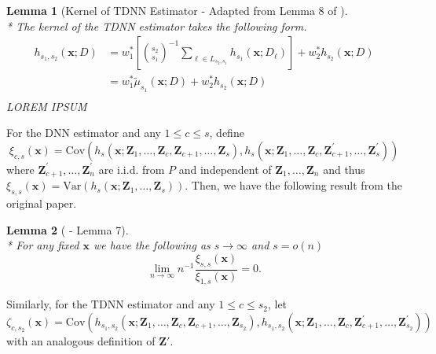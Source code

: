 \documentclass[letterpaper,10pt]{article}
\numberwithin{equation}{section}
\numberwithin{thm}{section}
\newtheorem{lem}{Lemma}
\numberwithin{lem}{section}
\numberwithin{cor}{section}
\newcommand{\1}{\mathbbm{1}}
\newcommand{\Var}{\text{Var}}
\newcommand{\Cov}{\text{Cov}}
\begin{document}
\begin{lem}[Kernel of TDNN Estimator - Adapted from Lemma 8 of \citet{demirkaya_optimal_2024}]\label{TDNN_kernel}\mbox{}\\*
	The kernel of the TDNN estimator takes the following form.
	\begin{equation}
		\begin{aligned}
			h_{s_1, s_2}\left(\mathbf{x}; D\right)
			 & = w_{1}^{*}\left[\binom{s_2}{s_1}^{-1}\sum_{\ell \in L_{s_2, s_1}} h_{s_1}\left(\mathbf{x}; D_{\ell}\right)\right] + w_{2}^{*} h_{s_2}\left(\mathbf{x}; D\right) \\
			 & = w_{1}^{*} \tilde{\mu}_{s_1}\left(\mathbf{x}; D\right) + w_{2}^{*} h_{s_2}\left(\mathbf{x}; D\right)                                                            \\
		\end{aligned}
	\end{equation}
	{\color{red} LOREM IPSUM}
\end{lem}


For the DNN estimator and any $1 \leq c \leq s$, define
\begin{equation}
	\xi_{c,s}\left(\mathbf{x}\right)
	= \Cov\left(h_{s}\left(\mathbf{x}; \mathbf{Z}_1, \ldots, \mathbf{Z}_c, \mathbf{Z}_{c+1}, \ldots, \mathbf{Z}_s\right),
	h_{s}\left(\mathbf{x}; \mathbf{Z}_1, \ldots, \mathbf{Z}_c, \mathbf{Z}_{c+1}^{\prime}, \ldots, \mathbf{Z}_s^{\prime}\right)\right)
\end{equation}
where $\mathbf{Z}_{c+1}^{\prime}, \ldots, \mathbf{Z}_n^{\prime}$ are i.i.d. from $P$ and independent of $\mathbf{Z}_1, \ldots, \mathbf{Z}_n$ and thus
$\xi_{s,s}\left(\mathbf{x}\right) = \Var\left(h_s\left(\mathbf{x}; \mathbf{Z}_1, \ldots, \mathbf{Z}_s\right)\right).$
Then, we have the following result from the original paper.

\begin{lem}[\citet{demirkaya_optimal_2024} - Lemma 7]\label{Cov_DNN_k}\mbox{}\\*
	For any fixed $\mathbf{x}$ we have the following as $s \rightarrow \infty$ and $s = o(n)$
	\begin{equation}
		\lim_{n \rightarrow \infty} n^{-1}\frac{\xi_{s,s}\left(\mathbf{x}\right)}{\xi_{1,s}\left(\mathbf{x}\right)}
		= 0.
	\end{equation}
\end{lem}

Similarly, for the TDNN estimator and any $1 \leq c \leq s_2$, let
\begin{equation}
	\zeta_{c,s_2}\left(\mathbf{x}\right)
	= \Cov\left(h_{s_1, s_2}\left(\mathbf{x}; \mathbf{Z}_1, \ldots, \mathbf{Z}_c, \mathbf{Z}_{c+1}, \ldots, \mathbf{Z}_{s_2}\right),
	h_{s_1, s_2}\left(\mathbf{x}; \mathbf{Z}_1, \ldots, \mathbf{Z}_c, \mathbf{Z}_{c+1}^{\prime}, \ldots, \mathbf{Z}_{s_2}^{\prime}\right)\right)
\end{equation}
with an analogous definition of $\mathbf{Z}'$.
\end{document}
